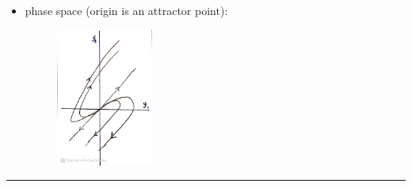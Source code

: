\documentclass[12pt, letterpaper]{scrartcl}
\begin{document}
\begin{itemize}
    \item phase space (origin is an attractor point):
    \begin{figure}[H]
    \centering
    \includegraphics[width=0.3\textwidth]{fig/2.8.17.JPG}
    \end{figure}
\end{itemize}
\vskip1mm\hrule
\end{document}
